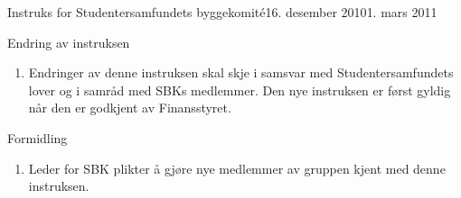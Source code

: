 \begin{instruks}{Instruks for Studentersamfundets byggekomité}{16. desember 2010}{1. mars 2011}
    \begin{instruksledd}{Endring av instruksen}
        \begin{enumerate}
            \item Endringer av denne instruksen skal skje i samsvar med Studentersamfundets lover
                og i samråd med SBKs
                medlemmer. Den nye instruksen er først gyldig når den er godkjent av Finansstyret.
        \end{enumerate}
    \end{instruksledd}

    \begin{instruksledd}{Formidling}
        \begin{enumerate}
            \item Leder for SBK plikter å gjøre nye medlemmer av gruppen kjent med denne
                instruksen.
        \end{enumerate}
    \end{instruksledd}


\end{instruks}


